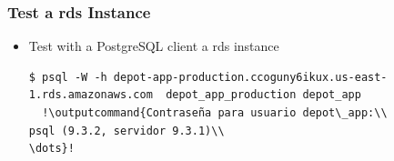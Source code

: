 \documentclass{beamer}
\newcommand{\outputcommand}[1]{\color{darkgreen}{#1}}
\begin{document}
\begin{frame}
\frametitle{Test a \acrshort{rds} Instance}
\begin{itemize}
 \item Test with a PostgreSQL client a \acrshort{rds} instance
 \lstset{language=shell, breaklines=true}
  \begin{lstlisting}[escapechar=!]
  $ psql -W -h depot-app-production.ccoguny6ikux.us-east-1.rds.amazonaws.com  depot_app_production depot_app
  !\outputcommand{Contraseña para usuario depot\_app:\\
psql (9.3.2, servidor 9.3.1)\\
\dots}!
 \end{lstlisting}
 \end{itemize}
\end{frame}
\end{document}
